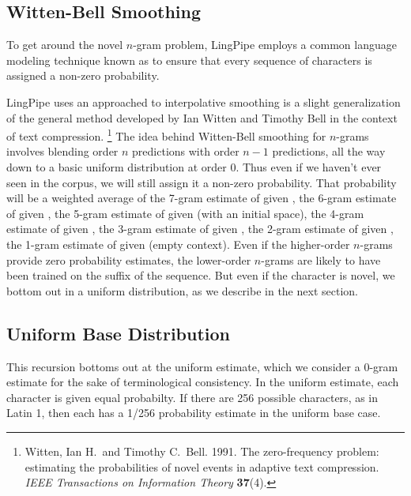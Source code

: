 \subsection{Witten-Bell Smoothing}

To get around the novel $n$-gram problem, LingPipe employs a common
language modeling technique known as  to
ensure that every sequence of characters is assigned a non-zero
probability.  

LingPipe uses an approached to interpolative smoothing is a slight
generalization of the general method developed by 
Ian Witten and Timothy Bell in the context of text compression.%
%
\footnote{Witten, Ian H.\ and Timothy C.~Bell. 1991. The zero-frequency
  problem: estimating the probabilities of novel events in adaptive
  text compression. {\it IEEE Transactions on Information Theory} {\bf 37}(4).}
%
The idea behind Witten-Bell smoothing for $n$-grams involves blending
order $n$ predictions with order $n-1$ predictions, all the way down
to a basic uniform distribution at order 0.  Thus even if we haven't
ever seen  in the corpus, we will still assign
it a non-zero probability.  That probability will be a weighted
average of the 7-gram estimate of  given
, the 6-gram estimate of  given
, the 5-gram estimate of  given
 (with an initial space), the 4-gram estimate of
 given , the 3-gram estimate of
 given , the 2-gram estimate of
 given , the 1-gram estimate of
 given \stringmention{} (empty context).  Even if
the higher-order $n$-grams provide zero probability estimates, the
lower-order $n$-grams are likely to have been trained on the suffix
of the sequence.  But even if the character is novel, we bottom out
in a uniform distribution, as we describe in the next section.

\subsection{Uniform Base Distribution}

This recursion bottoms out at the uniform estimate, which we consider
a 0-gram estimate for the sake of terminological consistency.  In the
uniform estimate, each character is given equal probabilty.  If there
are 256 possible characters, as in Latin 1, then each has a 1/256
probability estimate in the uniform base case.

